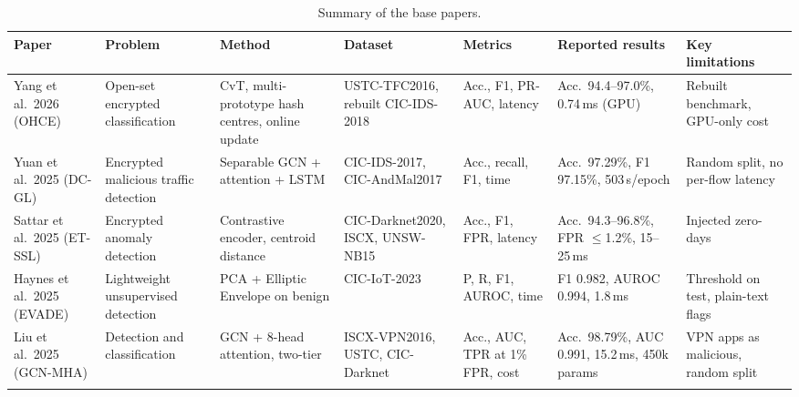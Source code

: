 \documentclass[pdflatex,sn-mathphys-num,iicol]{sn-jnl}%
\newcommand{\ms}{\,ms}
\begin{document}
\begin{table}[t]
\caption{Summary of the base papers.}\label{tab:base}
\footnotesize
\setlength{\tabcolsep}{2pt}
\begin{tabular}{@{}L{1.9cm}L{2.0cm}L{2.5cm}L{2.2cm}L{1.8cm}L{2.5cm}L{2.1cm}@{}}
\toprule
Paper & Problem & Method & Dataset & Metrics & Reported results & Key limitations \\
\midrule
Yang et al.\ 2026 (OHCE) \cite{yang2026ohce} & Open-set encrypted classification & CvT, multi-prototype hash centres, online update & USTC-TFC2016, rebuilt CIC-IDS-2018 & Acc., F1, PR-AUC, latency & Acc.\ 94.4--97.0\%, 0.74\ms{} (GPU) & Rebuilt benchmark, GPU-only cost \\
Yuan et al.\ 2025 (DC-GL) \cite{yuan2025dcgl} & Encrypted malicious traffic detection & Separable GCN + attention + LSTM & CIC-IDS-2017, CIC-AndMal2017 & Acc., recall, F1, time & Acc.\ 97.29\%, F1 97.15\%, 503\,s/epoch & Random split, no per-flow latency \\
Sattar et al.\ 2025 (ET-SSL) \cite{sattar2025etssl} & Encrypted anomaly detection & Contrastive encoder, centroid distance & CIC-Darknet2020, ISCX, UNSW-NB15 & Acc., F1, FPR, latency & Acc.\ 94.3--96.8\%, FPR $\le$1.2\%, 15--25\ms & Injected zero-days \\
Haynes et al.\ 2025 (EVADE) \cite{haynes2025evade} & Lightweight unsupervised detection & PCA + Elliptic Envelope on benign & CIC-IoT-2023 & P, R, F1, AUROC, time & F1 0.982, AUROC 0.994, 1.8\ms & Threshold on test, plain-text flags \\
Liu et al.\ 2025 (GCN-MHA) \cite{liu2025gcnmha} & Detection and classification & GCN + 8-head attention, two-tier & ISCX-VPN2016, USTC, CIC-Darknet & Acc., AUC, TPR at 1\% FPR, cost & Acc.\ 98.79\%, AUC 0.991, 15.2\ms, 450k params & VPN apps as malicious, random split \\
\botrule
\end{tabular}
\end{table}
\end{document}
